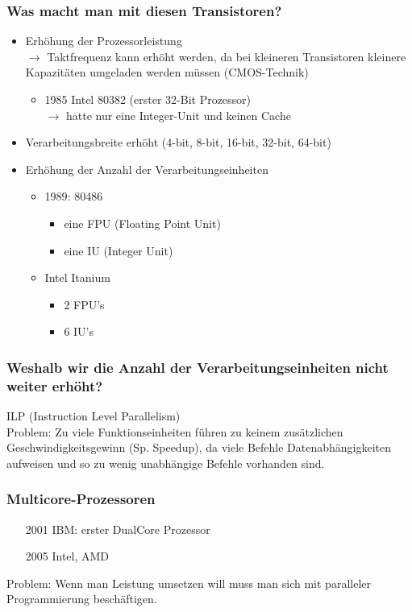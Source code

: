 \subsubsection{Was macht man mit diesen Transistoren?}
\begin{itemize}
	\item Erhöhung der Prozessorleistung \\ \(\to\) Taktfrequenz kann erhöht werden, da bei kleineren Transistoren kleinere Kapazitäten umgeladen werden müssen (CMOS-Technik)
	\begin{itemize}
		\item 1985 Intel 80382 (erster 32-Bit Prozessor) \\ \(\to\) hatte nur eine Integer-Unit und keinen Cache
	\end{itemize}
	\item Verarbeitungsbreite erhöht (4-bit, 8-bit, 16-bit, 32-bit, 64-bit)
	\item Erhöhung der Anzahl der Verarbeitungseinheiten
	\begin{itemize}
		\item 1989: 80486
		\begin{itemize}
			\item eine FPU (Floating Point Unit)
			\item eine IU (Integer Unit)
		\end{itemize}
		\item Intel Itanium
		\begin{itemize}
			\item 2 FPU's
			\item 6 IU's
		\end{itemize}
	\end{itemize}
\end{itemize}
\subsubsection{Weshalb wir die Anzahl der Verarbeitungseinheiten nicht weiter erhöht?}
ILP (Instruction Level Parallelism)\\
Problem: Zu viele Funktionseinheiten führen zu keinem zusätzlichen Geschwindigkeitsgewinn (Sp. Speedup), da viele Befehle Datenabhängigkeiten aufweisen und so zu wenig unabhängige Befehle vorhanden sind.
\subsubsection{Multicore-Prozessoren}
\begin{itemize}
	\item [2001] IBM: erster DualCore Prozessor
	\item [2005] Intel, AMD 	
\end{itemize}
Problem: Wenn man Leistung umsetzen will muss man sich mit paralleler Programmierung beschäftigen.
